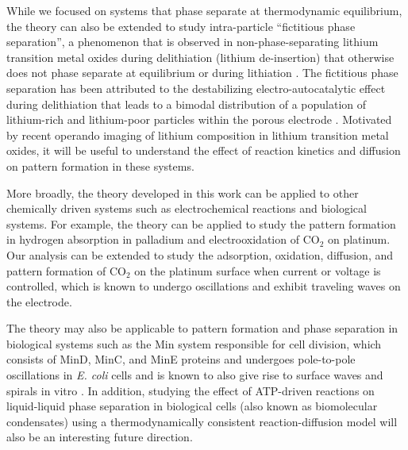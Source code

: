 \documentclass[reprint,aps,pre,superscriptaddress]{revtex4-2}
\begin{document}
While we focused on systems that phase separate at thermodynamic equilibrium, the theory can also be extended to study intra-particle ``fictitious phase separation'', a phenomenon that is observed in non-phase-separating lithium transition metal oxides during delithiation (lithium de-insertion) that otherwise does not phase separate at equilibrium or during lithiation \cite{Park2021,Zhou2016,Grenier2017,Marker2019}. The fictitious phase separation has been attributed to the destabilizing electro-autocatalytic effect during delithiation that leads to a bimodal distribution of a population of lithium-rich and lithium-poor particles within the porous electrode \cite{Park2021}.
Motivated by recent operando imaging of lithium composition in lithium transition metal oxides\cite{Merryweather2021,Xu2022}, it will be useful to understand the effect of reaction kinetics and diffusion on pattern formation in these systems.

More broadly, the theory developed in this work can be applied to other chemically driven systems such as electrochemical reactions and biological systems. For example, the theory can be applied to study the pattern formation in hydrogen absorption in palladium\cite{Narayan2017,Bardhan2013} and electrooxidation of $\text{CO}_2$ on platinum. Our analysis can be extended to study the adsorption, oxidation, diffusion, and pattern formation of $\text{CO}_2$ on the platinum surface when current or voltage is controlled\cite{Krischer2000,Varela2005}, which is known to undergo oscillations and exhibit traveling waves on the electrode\cite{Kim2001,Bonnefont2005}.

The theory may also be applicable to pattern formation and phase separation in biological systems such as the Min system responsible for cell division, which consists of MinD, MinC, and MinE proteins and undergoes pole-to-pole oscillations in \emph{E. coli} cells and is known to also give rise to surface waves and spirals in vitro \cite{Loose2008,}. In addition, studying the effect of ATP-driven reactions on liquid-liquid phase separation in biological cells (also known as biomolecular condensates)\cite{Brangwynne2015,Shin2017,Berry2018} using a thermodynamically consistent reaction-diffusion model \cite{Kirschbaum2021,Zwicker2022} will also be an interesting future direction.







\appendix
\end{document}
